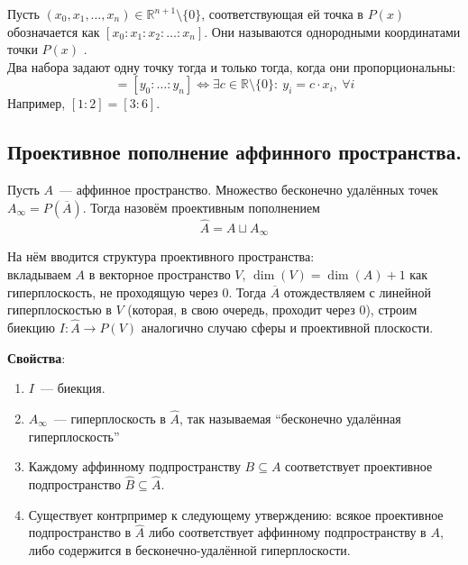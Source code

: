 \documentclass[11pt]{report}
\begin{document}
    Пусть $(x_0, x_1, \hdots, x_n) \in \mathbb{R}^{n+1} \setminus \{0\}$, соответствующая ей точка в $P(x)$ обозначается как $[x_0 : x_1 : x_2 : \hdots : x_n]$. Они называются однородными координатами точки $P(x)$
. \\

    Два набора задают одну точку тогда и только тогда, когда они пропорциональны:
    \begin{equation*}
        [x_0 : \hdots : x_n] = [y_0 : \hdots : y_n] \Longleftrightarrow \exists c \in \mathbb{R} \setminus \{0\}: \ y_i = c \cdot x_i, \ \forall i
    \end{equation*}
    Например, $[1 : 2] = [3 : 6]$.

    \subsection{Проективное пополнение аффинного пространства.}

    \begin{definition}
        Пусть $A$~--- аффинное пространство. Множество бесконечно удалённых точек $A_{\infty} = P(\overline{A})$. Тогда назовём проективным пополнением
        \begin{equation*}
            \hat{A} = A \sqcup A_{\infty}
        \end{equation*}
    \end{definition}

    На нём вводится структура проективного пространства: \\
    вкладываем $A$ в векторное пространство  $V$, $\dim(V) = \dim(A) + 1$ как гиперплоскость, не проходящую через $0$. Тогда $\overline{A}$ отождествляем с линейной гиперплоскостью в $V$ (которая, в свою очередь, проходит через $0$), строим биекцию $I: \hat{A} \to P(V)$ аналогично случаю сферы и проективной плоскости.

    \textbf{Свойства}:
    \begin{enumerate}
        \item $I$~--- биекция.
        \item $A_{\infty}$~--- гиперплоскость в $\hat{A}$, так называемая ``бесконечно удалённая гиперплоскость''
        \item Каждому аффинному подпространству $B \subseteq A$ соответствует проективное подпространство $\hat{B} \subseteq \hat{A}$.
        \item Существует контрпример к следующему утверждению: всякое проективное подпространство в $\hat{A}$ либо соответствует аффинному подпространству в $A$, либо содержится в бесконечно-удалённой гиперплоскости.
    \end{enumerate}
\end{document}

